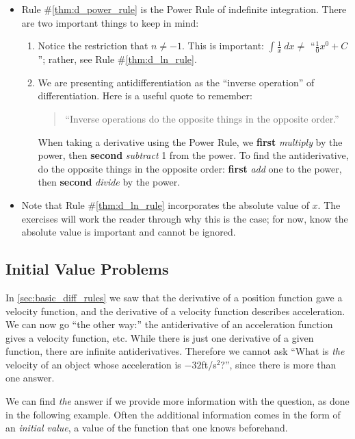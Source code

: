 \begin{itemize}
	\item	Rule \#\ref{thm:d_power_rule} is the Power Rule of indefinite integration. There are two important things to keep in mind:
	\begin{enumerate}
		\item	Notice the restriction that $n\neq -1$. This is important: $\int \frac{1}{x}\ dx \neq $ ``$\frac{1}{0}x^0+C$\primeskip''; rather, see Rule \#\ref{thm:d_ln_rule}.
		\item	We are presenting antidifferentiation as the ``inverse operation'' of differentiation. Here is a useful quote to remember:
		\begin{quote}
			``Inverse operations do the opposite things in the opposite order.''
		\end{quote}
		When taking a derivative using the Power Rule, we \textbf{first} \textit{multiply} by the power, then \textbf{second} \textit{subtract} 1 from the power. To find the antiderivative, do the opposite things in the opposite order: \textbf{first} \textit{add} one to the power, then \textbf{second} \textit{divide} by the power.
	\end{enumerate}
	\item	Note that Rule \#\ref{thm:d_ln_rule} incorporates the absolute value of $x$. The exercises will work the reader through why this is the case; for now, know the absolute value is important and cannot be ignored.
\end{itemize}

\subsection{Initial Value Problems}

In \autoref{sec:basic_diff_rules} we saw that the derivative of a position function gave a velocity function, and the derivative of a velocity function describes  acceleration. We can now go ``the other way:'' the antiderivative of an acceleration function gives a velocity function, etc. While there is just one derivative of a given function, there are infinite antiderivatives. Therefore we cannot ask ``What is \textit{the} velocity of an object whose acceleration is $-32$ft/s$^2$?'', since there is more than one answer.


We can find \textit{the} answer if we provide more information with the question, as done in the following example. Often the additional information comes in the form of an \textit{initial value}, a value of the function that one knows beforehand.

